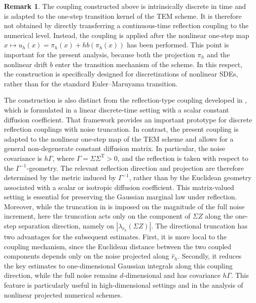 \documentclass[aap]{imsart}
\theoremstyle{plain}
\theoremstyle{definition}
\newtheorem{remark}{Remark}
\begin{document}
\begin{remark}
	The coupling constructed above is intrinsically discrete in time and is
	adapted to the one-step transition kernel of the TEM scheme. It is therefore
	not obtained by directly transferring a continuous-time reflection coupling to
	the numerical level. Instead, the coupling is applied after the nonlinear
	one-step map \(x\mapsto u_h(x)=\pi_h(x)+h b(\pi_h(x))\)
	has been performed. This point is important for the present analysis, because
	both the projection \(\pi_h\) and the nonlinear drift \(b\) enter the transition
	mechanism of the scheme. In this respect, the construction is specifically
	designed for discretizations of nonlinear SDEs, rather than for
	the standard Euler--Maruyama transition.
	
	The construction is also distinct from the reflection-type coupling developed
	in \cite{Majka}, which is formulated in a linear discrete-time setting with a
	scalar constant diffusion coefficient. That framework provides an important
	prototype for discrete reflection couplings with noise truncation. In contrast,
	the present coupling is adapted to the nonlinear one-step map of the TEM scheme
	and allows for a general non-degenerate constant diffusion matrix. In particular, the noise covariance is \(h\Gamma\), where \(\Gamma=\Sigma\Sigma^{\mathrm T}>0\),
	and the reflection is taken with respect to the
	\(\Gamma^{-1}\)-geometry. The relevant reflection direction and projection are
	therefore determined by the metric induced by \(\Gamma^{-1}\), rather than by
	the Euclidean geometry associated with a scalar or isotropic diffusion
	coefficient. This matrix-valued setting is essential for preserving the
	Gaussian marginal law under reflection. Moreover,
	while the truncation in \cite{Majka} is imposed on the magnitude of the full
	noise increment, here the truncation acts only on the component of \(\Sigma Z\)
	along the one-step separation direction, namely on \(|\lambda_{\hat r_h}(\Sigma Z)|\).	The directional truncation has two advantages for the subsequent estimates.
	First, it is more local to the coupling mechanism, since the Euclidean distance
	between the two coupled components depends only on the noise projected along
	\(\hat r_h\). Secondly, it reduces the key estimates to one-dimensional
	Gaussian integrals along this coupling direction, while the full noise remains
	\(d\)-dimensional and has covariance \(h\Gamma\). This feature is particularly
	useful in high-dimensional settings and in the analysis of nonlinear projected
	numerical schemes. 
\end{remark}
	
\end{document}
